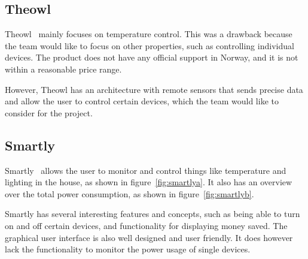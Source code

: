 \subsection{Theowl}

Theowl~\cite{theowl} mainly focuses on temperature control. This was a drawback because the team would like to focus on other properties, such as controlling individual devices. The product does not have any official support in Norway, and it is not within a reasonable price range. 

However, Theowl has an architecture with remote sensors that sends precise data and allow the user to control certain devices, which the team would like to consider for the project.


\subsection{Smartly}

Smartly~\cite{smartly} allows the user to monitor and control things like temperature and lighting in the house, as shown in figure~\ref{fig:smartlya}. It also has an overview over the total power consumption, as shown in figure~\ref{fig:smartlyb}.

Smartly has several interesting features and concepts, such as being able to turn on and off certain devices, and functionality for displaying money saved. The graphical user interface is also well designed and user friendly. It does however lack the functionality to monitor the power usage of single devices.

